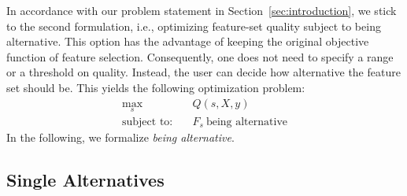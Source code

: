 \documentclass{article}
\theoremstyle{definition}
\begin{document}
In accordance with our problem statement in Section~\ref{sec:introduction}, we stick to the second formulation, i.e., optimizing feature-set quality subject to being alternative.
This option has the advantage of keeping the original objective function of feature selection.
Consequently, one does not need to specify a range or a threshold on quality.
Instead, the user can decide how alternative the feature set should be.
This yields the following optimization problem:
%
\begin{align}
	\max_s &\quad Q(s,X,y) \nonumber \\
	\text{subject to:} &\quad F_s~\text{being alternative}
\end{align}
%
In the following, we formalize \emph{being alternative}.

\subsection{Single Alternatives}
\end{document}
